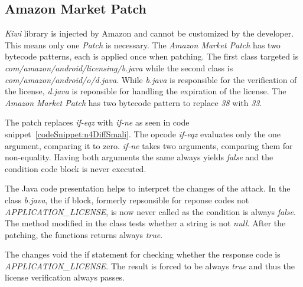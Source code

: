 \subsection{Amazon Market Patch}
\textit{Kiwi} library is injected by Amazon and cannot be customized by the developer.
This means only one \textit{Patch} is necessary.
The \textit{Amazon Market Patch} has two bytecode patterns, each is applied once when patching.
The first class targeted is \textit{com/amazon/android/licensing/b.java} while the second class is \textit{com/amazon/android/o/d.java}.
While \textit{b.java} is responsible for the verification of the license, \textit{d.java} is reponsible for handling the expiration of the license.
\newline
The \textit{Amazon Market Patch} has two bytecode pattern to replace \textit{38} with \textit{33}.
\newline

The patch replaces \textit{if-eqz} with \textit{if-ne} as seen in code snippet~\ref{codeSnippet:n4DiffSmali}.
The opcode \textit{if-eqz} evaluates only the one argument, comparing it to zero.
\textit{if-ne} takes two arguments, comparing them for non-equality.
Having both arguments the same always yields \textit{false} and the condition code block is never executed.

The Java code presentation helps to interpret the changes of the attack.
In the class \textit{b.java}, the if block, formerly repsonsible for reponse codes not \textit{APPLICATION\_LICENSE}, is now never called as the condition is always \textit{false}.
\newline
The method modified in the  class tests whether a string is not \textit{null}.
After the patching, the functions returns always \textit{true}.
\newline

The changes void the if statement for checking whether the response code is \textit{APPLICATION\_LICENSE}.
The result is forced to be always \textit{true} and thus the license verification always passes.

